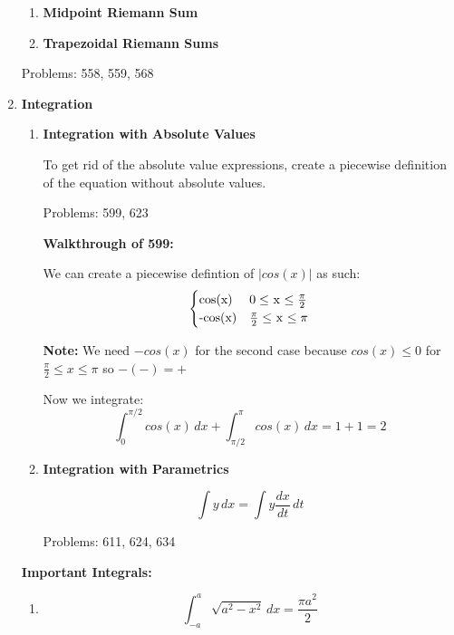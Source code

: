 \documentclass{article}
\begin{document}
\begin{enumerate}
\begin{enumerate}
    \item \textbf{Midpoint Riemann Sum} 
    \item \textbf{Trapezoidal Riemann Sums}
  \end{enumerate}

Problems: 558, 559, 568
  
\item \textbf{Integration}

\begin{enumerate}
    \item \textbf{Integration with Absolute Values}
    
    To get rid of the absolute value expressions, create a piecewise definition of the equation without absolute values. 
    
    Problems: 599, 623
    
    \textbf{Walkthrough of 599:}
    
    We can create a piecewise defintion of $|cos(x)|$ as such:
    \[ \begin{cases} 
    $cos(x)$ &  0 \leq $ x $ \leq \frac{\pi}{2} \\
    $-cos(x)$ &  \frac{\pi}{2} \leq $ x $ \leq \pi 
    \end{cases}
    \]
    
    \textbf{Note:} We need $-cos(x)$ for the second case because $cos(x) \leq 0$ for $\frac{\pi}{2} \leq x \leq \pi $ so $-(-) = +$
    
    Now we integrate:
    \begin{equation*}
    \int_{0}^{\pi/2} cos(x) \,dx +  \int_{\pi/2}^{\pi} cos(x) \,dx = 1 + 1 = 2
    \end{equation*}
    
    \item \textbf{Integration with Parametrics}
    
    \begin{equation*}
    \int y \,dx = \int y \frac{dx}{dt} \,dt
    \end{equation*}
    
    Problems: 611, 624, 634
    

    
\end{enumerate}

\textbf{Important Integrals:}
\begin{enumerate}
    \item \begin{equation*}
    \int_{-a}^{a} \sqrt{a^2-x^2} \,dx = \frac{\pi a^2}{2}
    \end{equation*}
    

\end{enumerate}
\end{enumerate}
\end{document}
